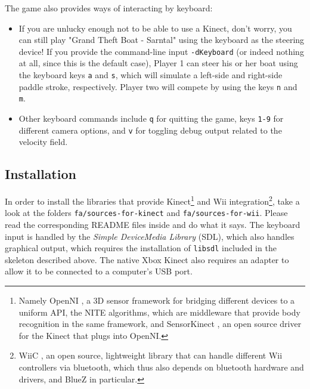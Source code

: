 The game also provides ways of interacting by keyboard:
\begin{itemize}
\item If you are unlucky enough not to be able to use a Kinect, don't worry, you can still play "Grand Theft Boat - Sarntal" using the keyboard as the steering device! If you provide the command-line input \texttt{-dKeyboard} (or indeed nothing at all, since this is the default case), Player 1 can steer his or her boat using the keyboard keys \texttt{a} and \texttt{s}, which will simulate a left-side and right-side paddle stroke, respectively. Player two will compete by using the keys \texttt{n} and \texttt{m}.
\item Other keyboard commands include \texttt{q} for quitting the game, keys \texttt{1-9} for different camera options, and \texttt{v} for toggling debug output related to the velocity field.
\end{itemize}



\subsection{Installation}
In order to install the libraries that provide Kinect\footnote{Namely OpenNI \cite{OpenNI}, a 3D sensor framework for bridging different devices to a uniform API, the NITE algorithms, which are middleware that provide body recognition in the same framework, and SensorKinect \cite{SensorKinect}, an open source driver for the Kinect that plugs into OpenNI.} and Wii integration\footnote{WiiC \cite{WiiC}, an open source, lightweight library that can handle different Wii controllers via bluetooth, which thus also depends on bluetooth hardware and drivers, and BlueZ in particular.}, take a look at the folders \texttt{fa/sources-for-kinect} and \texttt{fa/sources-for-wii}. Please read the corresponding README files inside and do what it says. The keyboard input is handled by the \emph{Simple DeviceMedia Library} (SDL), which also handles graphical output, which requires the installation of \texttt{libsdl} included in the skeleton described above. The native Xbox Kinect also requires an adapter to allow it to be connected to a computer's USB port.

